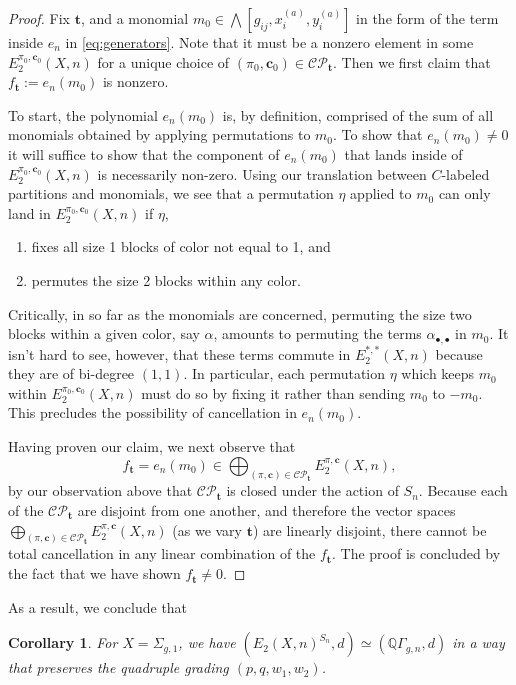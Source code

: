 \documentclass[11pt,reqno]{amsproc}
\numberwithin{equation}{section}
\newtheorem{corollary}[theorem]{Corollary}
\theoremstyle{definition}
\theoremstyle{remark}
\newcommand\Q{{\mathbb Q}}
\newcommand{\spp}[1]{^{(#1)}}
\begin{document}
\begin{proof}
Fix $\mathbf{t}$, and a monomial $m_0 \in \bigwedge[g_{ij}, x\spp{a}_i, y\spp{a}_i]$ in the form of the term inside $e_n$ in \eqref{eq:generators}. Note that it must be a nonzero element in some $E_2^{\pi_0,\mathbf{c}_0}(X,n)$ for a unique choice of $(\pi_0,\mathbf{c}_0)\in \mathcal{CP}_\mathbf{t}$. Then we first claim that $f_\mathbf{t}:=e_n(m_0)$ is nonzero. 

To start, the polynomial $e_n(m_0)$ is, by definition, comprised of the sum of all monomials obtained by applying permutations to $m_0$. To show that $e_n(m_0) \neq 0$ it will suffice to show that the component of $e_n(m_0)$ that lands inside of $E_2^{\pi_0,\mathbf{c}_0}(X,n)$ is necessarily non-zero. Using our translation between $C$-labeled partitions and monomials, we see that a permutation $\eta$ applied to $m_0$ can only land in $E_2^{\pi_0,\mathbf{c}_0}(X,n)$ if $\eta$,
\begin{enumerate}
    \item fixes all size 1 blocks of color not equal to 1, and
    \item permutes the size 2 blocks within any color.
\end{enumerate}
Critically, in so far as the monomials are concerned, permuting the size two blocks within a given color, say $\alpha$, amounts to permuting the terms $\alpha_{\bullet,\bullet}$ in $m_0$. It isn't hard to see, however, that these terms commute in $E_2^{*,*}(X,n)$ because they are of bi-degree $(1,1)$. In particular, each permutation $\eta$ which keeps $m_0$ within $E_2^{\pi_0,\mathbf{c}_0}(X,n)$ must do so by fixing it rather than sending $m_0$ to $-m_0$. This precludes the possibility of cancellation in $e_n(m_0)$.

Having proven our claim, we next observe that
\[
f_{\mathbf{t}} = e_n(m_0) \in \bigoplus_{(\pi,\mathbf{c}) \in \mathcal{CP}_{\mathbf{t}}} E_2^{\pi,\mathbf{c}}(X,n),
\]
by our observation above that $\mathcal{CP}_\mathbf{t}$ is closed under the action of $S_n$. Because each of the $\mathcal{CP}_\mathbf{t}$ are disjoint from one another, and therefore the vector spaces $\bigoplus_{(\pi,\mathbf{c}) \in \mathcal{CP}_{\mathbf{t}}} E_2^{\pi,\mathbf{c}}(X,n)$ (as we vary $\mathbf{t}$) are linearly disjoint, there cannot be total cancellation in any linear combination of the $f_{\mathbf{t}}$. The proof is concluded by the fact that we have shown $f_{\mathbf{t}} \neq 0$.
\end{proof}

As a result, we conclude that
\begin{corollary}\label{cor:substitution}
    For $X=\Sigma_{g,1}$, we have $(E_2(X,n)^{S_n},d)\simeq (\Q\Gamma_{g,n},d)$ in a way that preserves the quadruple grading $(p,q,w_1,w_2)$.
    \hfill\qedsymbol
\end{corollary}
\end{document}
